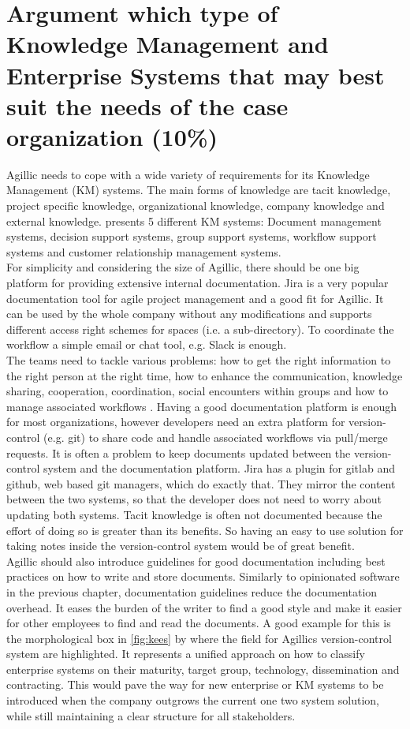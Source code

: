 \section{Argument which type of Knowledge Management and Enterprise Systems that may best suit the needs of the case organization (10\%)}
Agillic needs to cope with a wide variety of requirements for its Knowledge Management (KM) systems. The main forms of knowledge are tacit knowledge, project specific knowledge, organizational knowledge, company knowledge and external knowledge. \cite{jashapara2004knowledge} presents 5 different KM systems: Document management systems, decision support systems, group support systems, workflow support systems and customer relationship management systems.\\
For simplicity and considering the size of Agillic, there should be one big platform for providing extensive internal documentation. Jira \citep{jira} is a very popular documentation tool for agile project management and a good fit for Agillic. It can be used by the whole company without any modifications and supports different access right schemes for spaces (i.e. a sub-directory). To coordinate the workflow a simple email or chat tool, e.g. Slack \citep{slack} is enough.\\
The teams need to tackle various problems: how to get the right information to the right person at the right time, how to enhance the communication, knowledge sharing, cooperation, coordination, social encounters within groups and how to manage associated workflows \citep{jashapara2004knowledge}. Having a good documentation platform is enough for most organizations, however developers need an extra platform 
for version-control  (e.g. git) to share code and handle associated workflows via pull/merge requests. It is often a problem to keep documents updated between the version-control system and the documentation platform. Jira  has a plugin for gitlab and github, web based git managers, which do exactly that. They mirror the content between the two systems, so that the developer does not need to worry about updating both systems. Tacit knowledge is often not documented because the effort of doing so is greater than its benefits. So having an easy to use solution for taking notes inside the version-control system would be of great benefit. \\ 
Agillic should also introduce guidelines for good documentation including best practices on how to write and store documents. Similarly to opinionated software in the previous chapter, documentation guidelines reduce the documentation overhead. It eases the burden of the writer to find a good style and make it easier for other employees to find and read the documents. A good example for this is the morphological box in \cref{fig:kees} by \cite{kees2015characteristics} where the field for Agillics version-control system are highlighted. 
It represents a unified approach on how to classify enterprise systems on their maturity, target group, technology, dissemination and contracting. This would pave the way for new enterprise or KM systems to be introduced when the company outgrows the current one two system solution, while still maintaining a clear structure for all stakeholders.
